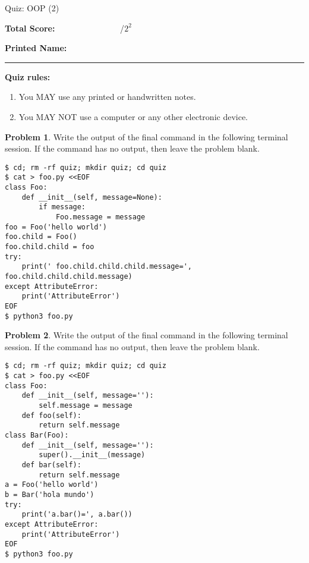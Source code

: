 \documentclass[10pt]{article}
\theoremstyle{definition}
\newtheorem{problem}{Problem}
\begin{document}
\begin{center}
    {
\Large
    Quiz: OOP (2)
}


    \vspace{0.1in}
\end{center}

\vspace{0.15in}
\noindent
\textbf{Total Score:} ~~~~~~~~~~~~~~~/$2^2$

\vspace{0.2in}
\noindent
\textbf{Printed Name:}

\noindent
\rule{\textwidth}{0.1pt}
\vspace{0.15in}

\noindent
\textbf{Quiz rules:}
\begin{enumerate}
    \item You MAY use any printed or handwritten notes.
    \item You MAY NOT use a computer or any other electronic device.
\end{enumerate}

\noindent

\vspace{0.15in}

\begin{problem}
    Write the output of the final command in the following terminal session.
    If the command has no output, then leave the problem blank.
\end{problem}
\begin{lstlisting}
$ cd; rm -rf quiz; mkdir quiz; cd quiz
$ cat > foo.py <<EOF
class Foo:
    def __init__(self, message=None):
        if message:
            Foo.message = message
foo = Foo('hello world')
foo.child = Foo()
foo.child.child = foo
try:
    print(' foo.child.child.child.message=', foo.child.child.child.message)
except AttributeError:
    print('AttributeError') 
EOF
$ python3 foo.py
\end{lstlisting}

\newpage
\begin{problem}
    Write the output of the final command in the following terminal session.
    If the command has no output, then leave the problem blank.
\end{problem}
\begin{lstlisting}
$ cd; rm -rf quiz; mkdir quiz; cd quiz
$ cat > foo.py <<EOF
class Foo:
    def __init__(self, message=''):
        self.message = message
    def foo(self):
        return self.message
class Bar(Foo):
    def __init__(self, message=''):
        super().__init__(message)
    def bar(self):
        return self.message
a = Foo('hello world')
b = Bar('hola mundo')
try:
    print('a.bar()=', a.bar())
except AttributeError:
    print('AttributeError') 
EOF
$ python3 foo.py
\end{lstlisting}
\end{document}
